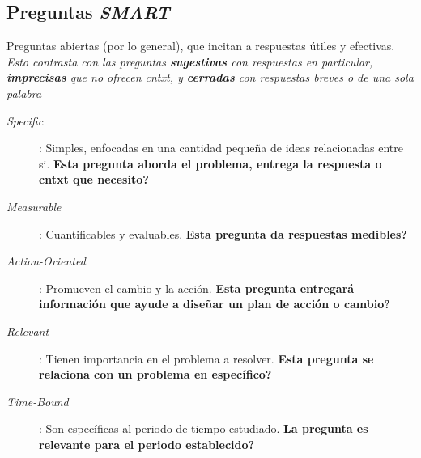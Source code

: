 \subsection{Preguntas \textit{SMART}}
Preguntas abiertas (por lo general), que incitan a respuestas útiles y efectivas. \textit{Esto contrasta con las preguntas \textbf{sugestivas} con respuestas en particular, \textbf{imprecisas} que no ofrecen \gls{cntxt}, y \textbf{cerradas} con respuestas breves o de una sola palabra}
\begin{description}
    \item [\textit{Specific}]{: Simples, enfocadas en una cantidad pequeña de ideas relacionadas entre si. \textbf{Esta pregunta aborda el problema, entrega la respuesta o \gls{cntxt} que necesito?}}
    \item [\textit{Measurable}]{: Cuantificables y evaluables. \textbf{Esta pregunta da respuestas medibles?}}
    \item [\textit{Action-Oriented}]{: Promueven el cambio y la acción. \textbf{Esta pregunta entregará información que ayude a diseñar un plan de acción o cambio?}}
    \item [\textit{Relevant}]{: Tienen importancia en el problema a resolver. \textbf{Esta pregunta se relaciona con un problema en específico?}}
    \item [\textit{Time-Bound}]{: Son específicas al periodo de tiempo estudiado. \textbf{La pregunta es relevante para el periodo establecido?}}
\end{description}

\newpage